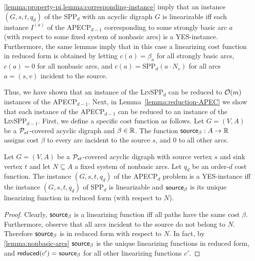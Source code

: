 \cref{lemma:property-pi,lemma:corresponding-instance} imply that an instance $(G,s,t,q_d)$ of the SPP$_d$ with an acyclic digraph $G$ is linearizable  iff each  instance $I^{(a)}$ of the APECP$_{d-1}$ corresponding to some strongly basic arc $a$   (with respect to some fixed system of nonbasic arcs)  is a YES-instance. Furthermore, the same lemmas imply that in this case a linearizing cost function in reduced form is obtained by letting $c(a) = \beta_a$ for all strongly basic arcs, $c(a) = 0$ for all nonbasic arcs, and $c(a) = \text{SPP}_d(a \cdot N_v)$ for all arcs $a = (s,v)$ incident to the source.


Thus, we have shown that an instance of the  \textsc{Lin}SPP$_d$ can be reduced to $\mathcal{O}(m)$ instances  of the APECP$_{d-1}$.  
Next, in Lemma~\ref{lemma:reduction-APEC} we show that each instance of the APECP$_{d-1}$  can  be reduced to an instance of  the \textsc{Lin}SPP$_{d-1}$.
%
First, we define a specific cost function as follows. 
Let $G = (V, A)$ be a $\mathcal{P}_{st}$-covered acyclic digraph and $\beta \in \mathbb{R}$. The function $\textsf{source}_\beta : A \rightarrow \mathbb{R}$  assigns cost $\beta$ to every arc incident to the source $s$, and $0$ to all other arcs.

\begin{lemma}
\label{lemma:reduction-APEC}
    Let $G = (V, A)$ be a $\mathcal{P}_{st}$-covered acyclic digraph with source vertex $s$ and sink vertex $t$ and let  $N \subseteq A$ a fixed system of nonbasic arcs. Let $q_d$ be an order-$d$  cost function. The instance $(G,s,t,q_d)$ of the APECP$_d$ problem is a YES-instance iff the instance $(G,s,t, q_d)$ of SPP$_d$ is linearizable and $\textsf{source}_\beta$ is its unique linearizing function in reduced form (with respect to $N$).
\end{lemma}
\begin{proof}
    Clearly,  $\textsf{source}_\beta$ is a linearizing function iff   all paths have the same cost $\beta$. %
    Furthermore, observe that all  arcs incident to the source do not belong to $N$. Therefore $\textsf{source}_\beta$ is in reduced form with respect to $N$. In fact, by \cref{lemma:nonbasic-arcs}  $\textsf{source}_\beta$ is the unique linearizing  functions in reduced form, and $\operatorname{\textsf{reduced}}(c') = \textsf{source}_\beta$ for all other linearizing functions $c'$.
\end{proof}



